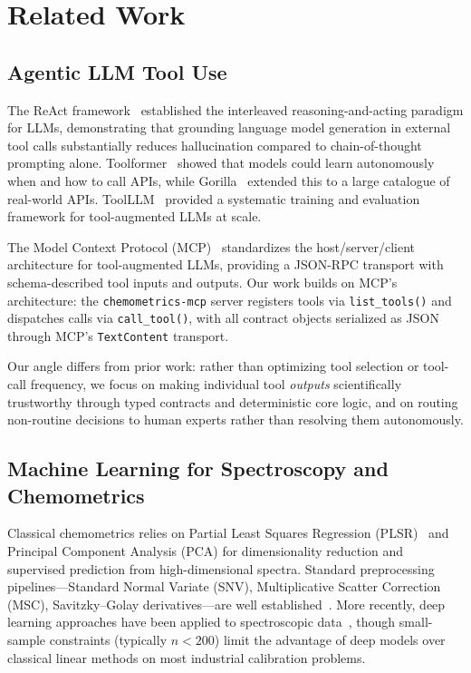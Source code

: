 
\section{Related Work}
\label{sec:related}

\subsection{Agentic LLM Tool Use}

The ReAct framework~\citep{yao2023react} established the interleaved
reasoning-and-acting paradigm for LLMs, demonstrating that grounding language
model generation in external tool calls substantially reduces hallucination
compared to chain-of-thought prompting alone.
Toolformer~\citep{schick2023toolformer} showed that models could learn
autonomously when and how to call APIs, while Gorilla~\citep{patil2023gorilla}
extended this to a large catalogue of real-world APIs.
ToolLLM~\citep{qin2024toolllm} provided a systematic training and evaluation
framework for tool-augmented LLMs at scale.

The Model Context Protocol (MCP)~\citep{anthropic2024mcp} standardizes the
host/server/client architecture for tool-augmented LLMs, providing a JSON-RPC
transport with schema-described tool inputs and outputs.
Our work builds on MCP's architecture: the \texttt{chemometrics-mcp} server
registers tools via \texttt{list\_tools()} and dispatches calls via
\texttt{call\_tool()}, with all contract objects serialized as JSON through
MCP's \texttt{TextContent} transport.

Our angle differs from prior work: rather than optimizing tool selection or
tool-call frequency, we focus on making individual tool \emph{outputs}
scientifically trustworthy through typed contracts and deterministic core
logic, and on routing non-routine decisions to human experts rather than
resolving them autonomously.

\subsection{Machine Learning for Spectroscopy and Chemometrics}

Classical chemometrics relies on Partial Least Squares Regression
(PLSR)~\citep{wold1984pls} and Principal Component Analysis (PCA) for
dimensionality reduction and supervised prediction from high-dimensional
spectra.
Standard preprocessing pipelines---Standard Normal Variate (SNV), Multiplicative
Scatter Correction (MSC), Savitzky--Golay derivatives---are well
established~\citep{rinnan2009review}.
More recently, deep learning approaches have been applied to spectroscopic
data~\citep{chen2021deep,mishra2021deepchemometrics}, though small-sample
constraints (typically $n < 200$) limit the advantage of deep models over
classical linear methods on most industrial calibration problems.

